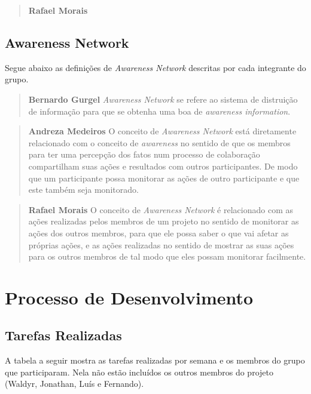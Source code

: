 \documentclass{acm_proc_article-sp}
\begin{document}
\begin{quote}\textbf{Rafael Morais}
\end{quote}

\subsection{Awareness Network}
Segue abaixo as definições de \textsl{Awareness Network} descritas por cada integrante do grupo.

\begin{quote}\textbf{Bernardo Gurgel}
\textsl{Awareness Network} se refere ao sistema de distruição de informação para que se obtenha uma boa de \textsl{awareness information}.
\end{quote}

\begin{quote}\textbf{Andreza Medeiros}
O conceito de \textsl{Awareness Network} está diretamente relacionado com o conceito de \textsl{awareness} no sentido de que os membros para ter uma percepção dos fatos num processo de colaboração compartilham suas ações e resultados com outros participantes. De modo que um participante possa monitorar as ações de outro participante e que este também seja monitorado. 
\end{quote}

\begin{quote}\textbf{Rafael Morais}
  O conceito de \textsl{Awareness Network} é relacionado com as ações realizadas pelos membros de um projeto no sentido de
  monitorar as ações dos outros membros, para que ele possa saber o que vai afetar as próprias ações, e as ações realizadas no sentido de
  mostrar as suas ações para os outros membros de tal modo que eles possam monitorar facilmente.
\end{quote}

\section{Processo de Desenvolvimento}
\subsection{Tarefas Realizadas}
A tabela a seguir mostra as tarefas realizadas por semana e os membros do grupo que participaram.
Nela não estão incluídos os outros membros do projeto (Waldyr, Jonathan, Luís e Fernando).
\end{document}
